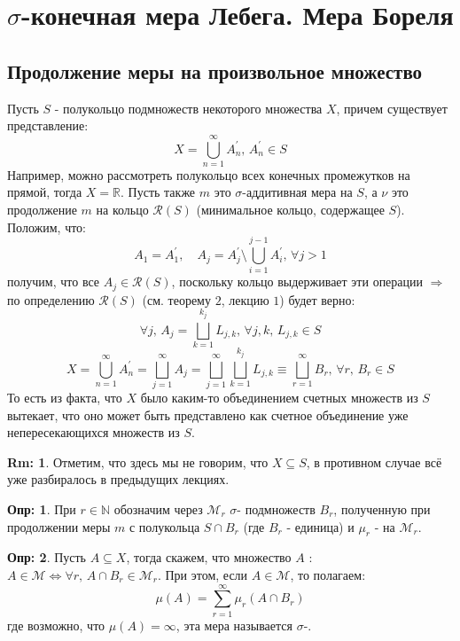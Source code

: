 \documentclass[12pt]{article}
\newcommand{\MR}{\mathbb{R}}
\newcommand{\MN}{\mathbb{N}}
\newcommand{\MCR}{\mathcal{R}}
\newcommand{\MM}{\mathcal{M}}
\theoremstyle{definition}
\newtheorem{defn}{Опр:}
\newtheorem{rem}{Rm:}
\begin{document}
\section*{$\sigma$-конечная мера Лебега. Мера Бореля}

\subsection*{Продолжение меры на произвольное множество}

Пусть $S$ - полукольцо подмножеств некоторого множества $X$, причем существует представление:
$$
	X = \bigcup\limits_{n = 1}^{\infty}A_n^\prime, \, A_n^\prime \in S
$$
Например, можно рассмотреть полукольцо всех конечных промежутков на прямой, тогда $X = \MR$. Пусть также $m$ это $\sigma$-аддитивная мера на $S$, а $\nu$ это продолжение $m$ на кольцо $\MCR(S)$ (минимальное кольцо, содержащее $S$). Положим, что:
$$
	A_1 = A_1^\prime, \quad A_j = A_j^\prime \setminus \bigcup\limits_{i = 1}^{j-1}A_i^\prime, \, \forall j > 1
$$
получим, что все $A_j \in \MCR(S)$, поскольку кольцо выдерживает эти операции $\Rightarrow$ по определению $\MCR(S)$ (см. теорему $2$, лекцию $1$) будет верно:
$$
	\forall j, \, A_j = \bigsqcup\limits_{k = 1}^{k_j} L_{j,k}, \, \forall j,k, \,  L_{j,k} \in S
$$
$$
	X = \bigcup\limits_{n = 1}^{\infty}A_n^\prime = \bigsqcup\limits_{j = 1}^{\infty}A_j = \bigsqcup\limits_{j = 1}^{\infty}\bigsqcup\limits_{k = 1}^{k_j} L_{j,k} \equiv \bigsqcup\limits_{r = 1}^{\infty}B_r, \, \forall r, \, B_r \in S
$$
То есть из факта, что $X$ было каким-то объединением счетных множеств из $S$ вытекает, что оно может быть представлено как счетное объединение уже непересекающихся множеств из $S$.
\begin{rem}
	Отметим, что здесь мы не говорим, что $X \subseteq S$, в противном случае всё уже разбиралось в предыдущих лекциях.
\end{rem}

\begin{defn}
	При $r \in \MN$ обозначим через $\MM_r$  $\sigma$- подмножеств $B_r$, полученную при продолжении меры $m$ с полукольца $S \cap B_r$ (где $B_r$ - единица) и $\mu_r$ -  на $\MM_r$.
\end{defn}

\begin{defn}
	Пусть $A \subseteq X$, тогда скажем, что множество $A$ : $A \in \MM \Leftrightarrow \forall r, \, A \cap B_r \in \MM_r $. При этом, если $A \in \MM$, то полагаем:
	$$
		\mu(A) = \sum\limits_{r = 1}^{\infty}\mu_r(A \cap B_r)
	$$
	где возможно, что $\mu(A) = \infty$, эта мера называется $\sigma$-.
\end{defn}
\end{document}
